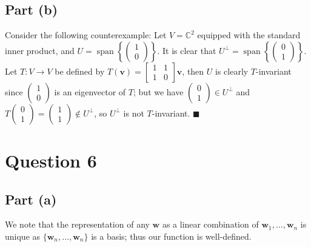 \documentclass[12pt]{article}
\DeclareMathOperator{\spn}{span}
\begin{document}
\subsection*{Part (b)}
Consider the following counterexample: Let $V=\mathbb{C}^2$ equipped with
the standard inner product, and
$U=\spn\left\{\begin{pmatrix} 1\\0 \end{pmatrix}\right\}$.
It is clear that
$U^\perp=\spn\left\{\begin{pmatrix} 0\\1 \end{pmatrix}\right\}$.
Let $T:V\to V$ be defined by
$T(\mathbf{v})=\begin{bmatrix} 1&1\\1&0 \end{bmatrix} \mathbf{v}$,
then $U$ is clearly $T$-invariant
since $\begin{pmatrix} 1\\0 \end{pmatrix}$ is an eigenvector of $T$; but
we have $\begin{pmatrix} 0\\1 \end{pmatrix} \in U^\perp$ and
$T\begin{pmatrix} 0\\1 \end{pmatrix}=\begin{pmatrix} 1\\1 \end{pmatrix}
\not\in U^\perp$, so $U^\perp$ is not $T$-invariant.
\hfill$\blacksquare$

\newpage
\section*{Question 6}
\subsection*{Part (a)}
We note that the representation of any $\mathbf{w}$ as a linear combination of
$\mathbf{w}_1,\ldots,\mathbf{w}_n$ is unique as 
$\{\mathbf{w}_n,\ldots,\mathbf{w}_n\}$ is a basis; thus our function is
well-defined.
\end{document}
